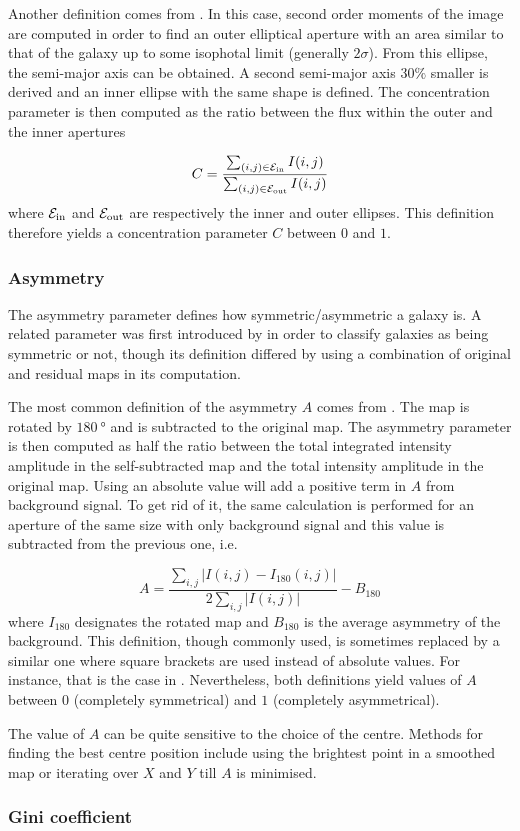 Another definition comes from . In this case, second order moments of the image are computed in order to find an outer elliptical aperture with an area similar to that of the galaxy up to some isophotal limit (generally $2\sigma$). From this ellipse, the semi-major axis can be obtained. A second semi-major axis $30\%$ smaller is derived and an inner ellipse with the same shape is defined. The concentration parameter is then computed as the ratio between the flux within the outer and the inner apertures

\begin{equation}
	C = \frac{\sum_{(i, j) \in \rm{\mathcal{E}_{in}}} I(i, j)}{\sum_{(i, j) \in \rm{\mathcal{E}_{out}}} I(i, j)}
	\label{eq:concentration_abraham_form}
\end{equation}
where $\rm{\mathcal{E}_{in}}$ and $\rm{\mathcal{E}_{out}}$ are respectively the inner and outer ellipses. This definition therefore yields a concentration parameter $C$ between $0$ and $1$.

\subsubsection{Asymmetry}

The asymmetry parameter defines how symmetric/asymmetric a galaxy is. A related parameter was first introduced by  in order to classify galaxies as being symmetric or not, though its definition differed by using a combination of original and residual maps in its computation.

The most common definition of the asymmetry $A$ comes from . The map is rotated by $\SI{180}{\degree}$ and is subtracted to the original map. The asymmetry parameter is then computed as half the ratio between the total integrated intensity amplitude in the self-subtracted map and the total intensity amplitude in the original map. Using an absolute value will add a positive term in $A$ from background signal. To get rid of it, the same calculation is performed for an aperture of the same size with only background signal and this value is subtracted from the previous one, i.e.

\begin{equation}
	A = \frac{\sum_{i , j} \left | I(i,j) - I_{180} (i , j) \right | }{2 \sum_{i, j} \left | I(i,j) \right |} - B_{180}
\end{equation}
where $I_{180}$ designates the rotated map and $B_{180}$ is the average asymmetry of the background. This definition, though commonly used, is sometimes replaced by a similar one where square brackets are used instead of absolute values. For instance, that is the case in . Nevertheless, both definitions yield values of $A$ between $0$ (completely symmetrical) and $1$ (completely asymmetrical).

The value of $A$ can be quite sensitive to the choice of the centre. Methods for finding the best centre position include using the brightest point in a smoothed map or iterating over $X$ and $Y$ till $A$ is minimised.

\subsubsection{Gini coefficient}

